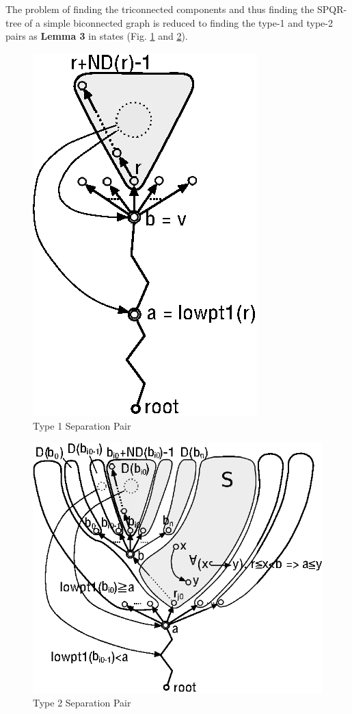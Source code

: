 \documentclass[twoside,twocolumn]{article}
\begin{document}
The problem of finding the triconnected components and thus finding the
SPQR-tree of a simple biconnected graph is reduced to finding the type-1 and
type-2 pairs as {\bf Lemma 3} in \cite{GM01} states (Fig. \ref{fig:fig1} and \ref{fig:fig2}).

\begin{figure}[!htb]
\centering
\includegraphics[scale=1.0]{spqr_fig1.eps}
\caption{Type 1 Separation Pair}
\label{fig:fig1}
\end{figure}

\begin{figure}[!htb]
\centering
\includegraphics[scale=0.9]{spqr_fig2.eps}
\caption{Type 2 Separation Pair}
\label{fig:fig2}
\end{figure}
\end{document}
